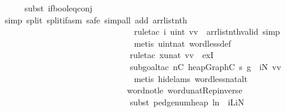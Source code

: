 \begin{isabellebody}
\ \ \ \ \isamarkupfalse%
\ {\isacharparenleft}subst\ if{\isacharunderscore}bool{\isacharunderscore}eq{\isacharunderscore}conj{\isacharparenright}{\isacharplus}\isanewline
\ \ \ \ \isamarkupfalse%
\ {\isacharparenleft}simp\ split{\isacharcolon}\ split{\isacharunderscore}if{\isacharunderscore}asm{\isacharcomma}\ safe{\isacharcomma}\ simp{\isacharunderscore}all\ add{\isacharcolon}\ arrlist{\isacharunderscore}nth{\isacharparenright}\ \ \isanewline
\ \ \ \ \ \ \ \ \ \ \ \ \ \ \ \ \ \ \ \ \ \ \ \ \ \ \ \ \ \ \isamarkupfalse%
\ {\isacharparenleft}rule{\isacharunderscore}tac\ i{\isacharequal}{\isachardoublequoteopen}\ {\isacharparenleft}uint\ vv{\isacharparenright}{\isachardoublequoteclose}\ \ arrlist{\isacharunderscore}nth{\isacharunderscore}valid{\isacharcomma}\ simp{\isacharplus}{\isacharparenright}\isanewline
\ \ \ \ \ \ \ \ \ \ \ \ \ \ \ \ \ \ \ \ \ \ \ \ \ \ \ \ \ \ \isamarkupfalse%
\ {\isacharparenleft}metis\ uint{\isacharunderscore}nat\ word{\isacharunderscore}less{\isacharunderscore}def{\isacharparenright}\isanewline
\ \ \ \ \ \ \ \ \ \ \ \ \ \ \ \ \ \ \ \ \ \ \ \ \ \ \ \ \ \isamarkupfalse%
\ {\isacharparenleft}rule{\isacharunderscore}tac\ x{\isacharequal}{\isachardoublequoteopen}unat\ vv{\isachardoublequoteclose}\ \ exI{\isacharparenright}\ \isanewline
\ \ \ \ \ \ \ \ \ \ \ \ \ \ \ \ \ \ \ \ \ \ \ \ \ \ \ \ \ \isamarkupfalse%
\ {\isacharparenleft}subgoal{\isacharunderscore}tac\ {\isachardoublequoteopen}n{\isacharunderscore}C\ {\isacharparenleft}heap{\isacharunderscore}Graph{\isacharunderscore}C\ s\ g{\isacharparenright}\ {\isasymle}\ iN\ vv{\isachardoublequoteclose}{\isacharparenright}\ \isanewline
\ \ \ \ \ \ \ \ \ \ \ \ \ \ \ \ \ \ \ \ \ \ \ \ \ \ \ \ \ \ \isamarkupfalse%
\ {\isacharparenleft}metis\ {\isacharparenleft}hide{\isacharunderscore}lams{\isacharparenright}\ word{\isacharunderscore}less{\isacharunderscore}nat{\isacharunderscore}alt\ \isanewline
\ \ \ \ \ \ \ \ \ \ \ \ \ \ \ \ \ \ \ \ \ \ \ \ \ \ \ \ \ \ word{\isacharunderscore}not{\isacharunderscore}le\ word{\isacharunderscore}unat{\isachardot}Rep{\isacharunderscore}inverse{\isacharparenright}\isanewline
\ \ \ \ \ \ \ \ \ \ \ \ \ \ \ \ \ \ \ \ \ \ \ \ \ \ \ \ \ \isamarkupfalse%
\ {\isacharparenleft}subst\ pedge{\isacharunderscore}num{\isacharunderscore}heap{\isacharbrackleft}\ l{\isacharequal}n\ \ iL{\isacharequal}iN{\isacharbrackright}{\isacharparenright}\isanewline
\ \ \ \ \ \ \ \ \ \ \ \ \ \ \ \ \ \ \ \ \ \ \ \ \ \ \ \ \ \ \ \isamarkupfalse%

\end{isabellebody}
